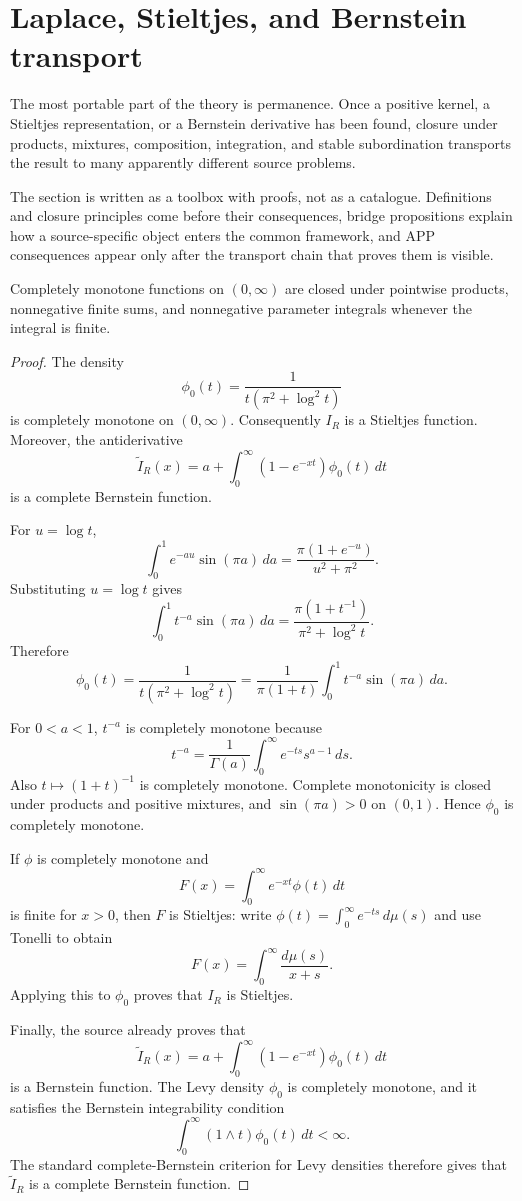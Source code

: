 \section{Laplace, Stieltjes, and Bernstein transport}
The most portable part of the theory is permanence.  Once a positive kernel, a Stieltjes representation, or a Bernstein derivative has been found, closure under products, mixtures, composition, integration, and stable subordination transports the result to many apparently different source problems.

The section is written as a toolbox with proofs, not as a catalogue.  Definitions and closure principles come before their consequences, bridge propositions explain how a source-specific object enters the common framework, and APP consequences appear only after the transport chain that proves them is visible.
\begin{theorem}
\label{res:cm-closure-product-positive-mixture}
Completely monotone functions on \((0,\infty)\) are closed under pointwise products, nonnegative finite sums, and nonnegative parameter integrals whenever the integral is finite.
\end{theorem}
\begin{proof}
The density
\[
\phi_0(t)=\frac{1}{t(\pi^2+\log^2 t)}
\]
is completely monotone on \((0,\infty)\). Consequently \(I_R\) is a Stieltjes function. Moreover, the antiderivative
\[
\widetilde I_R(x)=a+\int_0^\infty (1-e^{-xt})\phi_0(t)\,dt
\]
is a complete Bernstein function.

For \(u=\log t\),
\[
\int_0^1 e^{-au}\sin(\pi a)\,da
=\frac{\pi(1+e^{-u})}{u^2+\pi^2}.
\]
Substituting \(u=\log t\) gives
\[
\int_0^1 t^{-a}\sin(\pi a)\,da
=\frac{\pi(1+t^{-1})}{\pi^2+\log^2 t}.
\]
Therefore
\[
\phi_0(t)
=\frac{1}{t(\pi^2+\log^2 t)}
=\frac{1}{\pi(1+t)}\int_0^1 t^{-a}\sin(\pi a)\,da.
\]

For \(0<a<1\), \(t^{-a}\) is completely monotone because
\[
t^{-a}=\frac1{\Gamma(a)}\int_0^\infty e^{-ts}s^{a-1}\,ds.
\]
Also \(t\mapsto(1+t)^{-1}\) is completely monotone. Complete monotonicity is closed under products and positive mixtures, and \(\sin(\pi a)>0\) on \((0,1)\). Hence \(\phi_0\) is completely monotone.

If \(\phi\) is completely monotone and
\[
F(x)=\int_0^\infty e^{-xt}\phi(t)\,dt
\]
is finite for \(x>0\), then \(F\) is Stieltjes: write \(\phi(t)=\int_0^\infty e^{-ts}\,d\mu(s)\) and use Tonelli to obtain
\[
F(x)=\int_0^\infty\frac{d\mu(s)}{x+s}.
\]
Applying this to \(\phi_0\) proves that \(I_R\) is Stieltjes.

Finally, the source already proves that
\[
\widetilde I_R(x)=a+\int_0^\infty (1-e^{-xt})\phi_0(t)\,dt
\]
is a Bernstein function. The Levy density \(\phi_0\) is completely monotone, and it satisfies the Bernstein integrability condition
\[
\int_0^\infty (1\wedge t)\phi_0(t)\,dt<\infty.
\]
The standard complete-Bernstein criterion for Levy densities therefore gives that \(\widetilde I_R\) is a complete Bernstein function.
\end{proof}

